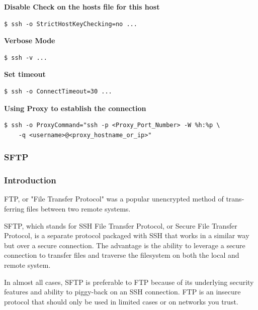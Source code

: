 \documentclass{article}
\newenvironment{codetemplate}[1][]{%
  \mybasecolorbox[#1]
  \itshape
}{%
  \endmybasecolorbox
}
\begin{document}
\textbf{Disable Check on the hosts file for this host}
\begin{codetemplate}{}
\begin{verbatim}
$ ssh -o StrictHostKeyChecking=no ...
\end{verbatim}
\end{codetemplate}

\textbf{Verbose Mode}
\begin{codetemplate}{}
\begin{verbatim}
$ ssh -v ...
\end{verbatim}
\end{codetemplate}

\textbf{Set timeout}
\begin{codetemplate}{}
\begin{verbatim}
$ ssh -o ConnectTimeout=30 ...
\end{verbatim}
\end{codetemplate}

\textbf{Using Proxy to establish the connection}
\begin{codetemplate}{}
\begin{verbatim}
$ ssh -o ProxyCommand="ssh -p <Proxy_Port_Number> -W %h:%p \
    -q <username>@<proxy_hostname_or_ip>"
\end{verbatim}
\end{codetemplate}

\subsubsection{SFTP}

\subsubsection{Introduction}
FTP, or "File Transfer Protocol" was a popular unencrypted method of trans-
ferring files between two remote systems.

SFTP, which stands for SSH File Transfer Protocol, or Secure File Transfer
Protocol, is a separate protocol packaged with SSH that works in a similar way
but over a secure connection. The advantage is the ability to leverage a secure
connection to transfer files and traverse the filesystem on both the local and
remote system.

In almost all cases, SFTP is preferable to FTP because of its underlying security
features and ability to piggy-back on an SSH connection. FTP is an insecure
protocol that should only be used in limited cases or on networks you trust.
\end{document}
